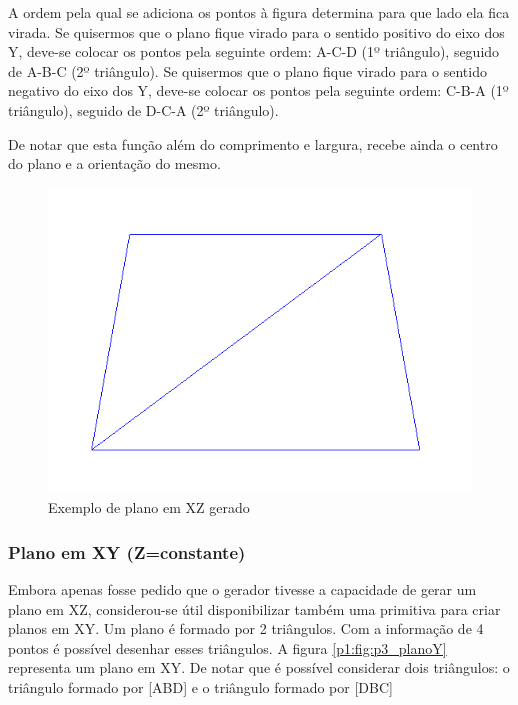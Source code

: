 A ordem pela qual se adiciona os pontos à figura determina para que lado ela fica virada. Se quisermos que o plano fique virado para o sentido positivo do eixo dos Y, deve-se colocar os pontos pela seguinte ordem: A-C-D (1º triângulo), seguido de A-B-C (2º triângulo). Se quisermos que o plano fique virado para o sentido negativo do eixo dos Y, deve-se colocar os pontos pela seguinte ordem: C-B-A (1º triângulo), seguido de D-C-A (2º triângulo).



De notar que esta função além do comprimento e largura, recebe ainda o centro do plano e a orientação do mesmo.

\begin{figure}[<+htpb+>]
	\centering
	\includegraphics[scale=0.5]{imagens/p3_plano.png}
	\caption{Exemplo de plano em XZ gerado}
	\label{p1:fig:p3_plano_4_2}
\end{figure}


\newpage

\subsubsection{Plano em XY (Z=constante)}

Embora apenas fosse pedido que o gerador tivesse a capacidade de gerar um plano em XZ, considerou-se útil disponibilizar também uma primitiva para criar planos em XY.
Um plano é formado por 2 triângulos. Com a informação de 4 pontos é possível desenhar esses triângulos. A figura \ref{p1:fig:p3_planoY} representa um plano em XY. De notar que é possível considerar dois triângulos: o triângulo formado por [ABD] e o triângulo formado por [DBC]

